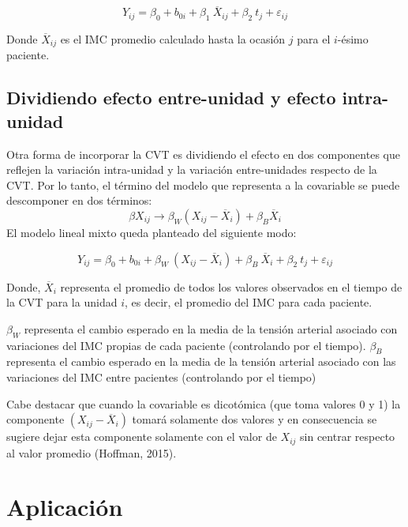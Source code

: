 \documentclass[spanish]{article}
\numberwithin{figure}{subsection}
\numberwithin{equation}{subsection}
\numberwithin{table}{subsection}
\begin{document}
\[ Y_{ij} = \beta_0 + b_{0i} + \beta_1\ \overline{X}_{ij} + \beta_2\ t_j + \varepsilon_{ij} \]

Donde $\overline{X}_{ij}$ es el IMC promedio calculado hasta la ocasión $j$ para
el $i$-ésimo paciente.

\subsection{Dividiendo efecto entre-unidad y efecto intra-unidad}
\label{Dividiendo efecto entre-unidad y efecto intra-unidad}

Otra forma de incorporar la CVT es dividiendo el efecto en dos componentes que
reflejen la variación intra-unidad y la variación entre-unidades respecto de la
CVT. Por lo tanto, el término del modelo que representa a la covariable se puede
descomponer en dos términos:
\[ \beta X_{ij} \rightarrow \beta_W (X_{ij} - \overline{X}_i) + \beta_B \overline{X}_i \]
El modelo lineal mixto queda planteado del siguiente modo:

\[ 
	Y_{ij} = \beta_0 + b_{0i} + \beta_W\ (X_{ij} - \overline{X}_i) + \beta_B\ \overline{X}_i
	+ \beta_2\ t_j + \varepsilon_{ij}
\]

Donde, $\overline{X}_i$ representa el promedio de todos los valores observados
en el tiempo de la CVT para la unidad $i$, es decir, el promedio del IMC para
cada paciente.

$\beta_W$ representa el cambio esperado en la media de la tensión arterial
asociado con variaciones del IMC propias de cada paciente (controlando por el
tiempo). $\beta_B$ representa el cambio esperado en la media de la tensión
arterial asociado con las variaciones del IMC entre pacientes (controlando por
el tiempo)

Cabe destacar que cuando la covariable es dicotómica (que toma valores 0 y 1) la
componente $(X_{ij} - \overline{X}_i)$ tomará solamente dos valores y en
consecuencia se sugiere dejar esta componente solamente con el valor de $X_{ij}$
sin centrar respecto al valor promedio (Hoffman, 2015).

\newpage

\section{Aplicación}
\end{document}
